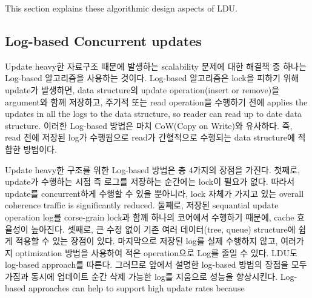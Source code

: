 

This section explains these algorithmic design aspects of LDU.
\fi



\subsection{Log-based Concurrent updates}


\ifkor
Update heavy한 자료구조 때문에 발생하는 scalability 문제에 대한 해결책 중 하나는 Log-based 알고리즘을 사용하는
것이다.
Log-based 알고리즘은 lock을 피하기 위해 update가 발생하면, data structure의 update
operation(insert or remove)을 argument와 함께 저장하고, 주기적 또는 read operation을 수행하기 전에
applies the updates in all the logs to the data structure, so reader can read up to date data structure.
이러한 Log-based 방법은 마치 CoW(Copy on Write)와 유사하다.
즉, read 전에 저장된 log가 수행됨으로 read가 간혈적으로 수행되는 data structure에 적합한 방법이다.
\else






\fi

%
\ifkor
Update heavy한 구조를 위한 Log-based 방법은 총 4가지의 장점을 가진다. 
첫째로, update가 수행하는 시점 즉 로그를 저장하는 순간에는 lock이 필요가 없다. 
따라서 update를 concurrent하게 수행할 수 있을 뿐아니라, lock 자체가 가지고 있는 overall
coherence traffic is significantly reduced.
둘째로, 저장된 sequantial update operation log를 corse-grain lock과 함께 하나의 코어에서 수행하기
때문에, cache 효율성이 높아진다.
셋째로, 큰 수정 없이 기존 여러 데이터(tree, queue) structure에 쉽게 적용할 수 있는 장점이 있다.
마지막으로 저장된 log를 실제 수행하지 않고, 여러가지 optimization 방법을 사용하여 적은 operation으로 Log를 줄일 수
있다. 
LDU도 log-based approach를 따른다. 그러므로 앞에서 설명한 log-based 방법의 장점을 모두 가짐과 동시에
업데이트 순간 삭제 가능한 log를 지움으로 성능을 향상시킨다.
\else
Log-based approaches can help to support high update rates because


